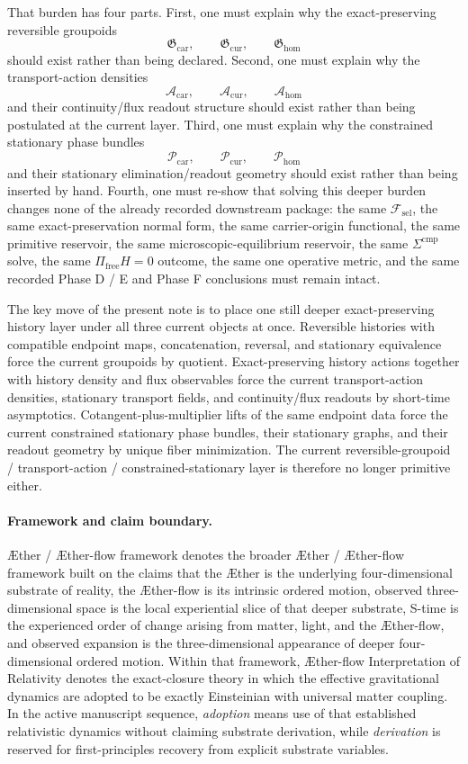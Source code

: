 \documentclass[11pt]{article}
\newcommand{\Aether}{\AE{}ther}
\newcommand{\Aflow}{\AE{}ther-flow}
\newcommand{\TheoryName}{\Aflow{} Interpretation of Relativity}
\newcommand{\TheoryProgram}{\Aether{} / \Aflow{} framework}
\newcommand{\StemFunctional}{\mathscr F_{\mathrm{sel}}}
\newcommand{\TensorGroupoid}{\mathfrak G_{\mathrm{car}}}
\newcommand{\CurGroupoid}{\mathfrak G_{\mathrm{cur}}}
\newcommand{\HomGroupoid}{\mathfrak G_{\mathrm{hom}}}
\newcommand{\TensorActionDensity}{\mathscr A_{\mathrm{car}}}
\newcommand{\CurActionDensity}{\mathscr A_{\mathrm{cur}}}
\newcommand{\HomActionDensity}{\mathscr A_{\mathrm{hom}}}
\newcommand{\TensorPhaseClass}{\mathscr P_{\mathrm{car}}}
\newcommand{\CurPhaseClass}{\mathscr P_{\mathrm{cur}}}
\newcommand{\HomPhaseClass}{\mathscr P_{\mathrm{hom}}}
\begin{document}
That burden has four parts. First, one must explain why the exact-preserving reversible groupoids
\[
\TensorGroupoid,\qquad
\CurGroupoid,\qquad
\HomGroupoid
\]
should exist rather than being declared. Second, one must explain why the transport-action densities
\[
\TensorActionDensity,\qquad
\CurActionDensity,\qquad
\HomActionDensity
\]
and their continuity/flux readout structure should exist rather than being postulated at the current layer. Third, one must explain why the constrained stationary phase bundles
\[
\TensorPhaseClass,\qquad
\CurPhaseClass,\qquad
\HomPhaseClass
\]
and their stationary elimination/readout geometry should exist rather than being inserted by hand. Fourth, one must re-show that solving this deeper burden changes none of the already recorded downstream package: the same \(\StemFunctional\), the same exact-preservation normal form, the same carrier-origin functional, the same primitive reservoir, the same microscopic-equilibrium reservoir, the same \(\Sigma^{\mathrm{cmp}}\) solve, the same \(\Pi_{\mathrm{free}}H=0\) outcome, the same one operative metric, and the same recorded Phase D / E and Phase F conclusions must remain intact.

The key move of the present note is to place one still deeper exact-preserving history layer under all three current objects at once. Reversible histories with compatible endpoint maps, concatenation, reversal, and stationary equivalence force the current groupoids by quotient. Exact-preserving history actions together with history density and flux observables force the current transport-action densities, stationary transport fields, and continuity/flux readouts by short-time asymptotics. Cotangent-plus-multiplier lifts of the same endpoint data force the current constrained stationary phase bundles, their stationary graphs, and their readout geometry by unique fiber minimization. The current reversible-groupoid / transport-action / constrained-stationary layer is therefore no longer primitive either.

\paragraph{Framework and claim boundary.}
\TheoryProgram{} denotes the broader \Aether{} / \Aflow{} framework built on the claims that the \Aether{} is the underlying four-dimensional substrate of reality, the \Aflow{} is its intrinsic ordered motion, observed three-dimensional space is the local experiential slice of that deeper substrate, S-time is the experienced order of change arising from matter, light, and the \Aflow{}, and observed expansion is the three-dimensional appearance of deeper four-dimensional ordered motion. Within that framework, \TheoryName{} denotes the exact-closure theory in which the effective gravitational dynamics are adopted to be exactly Einsteinian with universal matter coupling. In the active manuscript sequence, \emph{adoption} means use of that established relativistic dynamics without claiming substrate derivation, while \emph{derivation} is reserved for first-principles recovery from explicit substrate variables.
\end{document}
